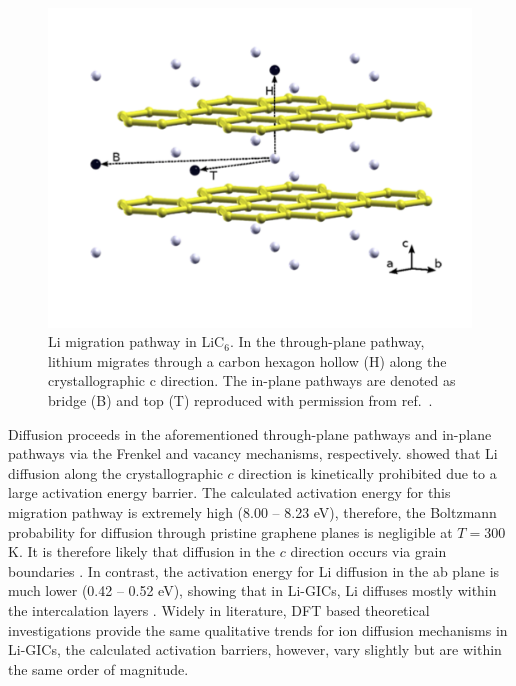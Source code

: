 \documentclass[../main.tex]{subfiles}
\begin{document}
\begin{figure}
    \centering           
    \includegraphics[scale=0.8]{figures/Islam-Fig-LiC6.png}
    \caption{Li migration pathway in LiC$_{6}$. In the through-plane pathway, lithium migrates through a carbon hexagon hollow (H) along the crystallographic c direction. The in-plane pathways are denoted as bridge (B) and top (T) reproduced with permission from ref.~.}
    \label{fig:Rl}
\end{figure}
        

 Diffusion proceeds in the aforementioned through-plane pathways and in-plane pathways via the Frenkel and vacancy mechanisms, respectively. \citeauthor{thinius2014theoretical} showed that Li diffusion along the crystallographic $c$ direction is kinetically prohibited due to a large activation energy barrier. \cite{thinius2014theoretical} The calculated activation energy for this migration pathway is extremely high (8.00 -- 8.23 eV), therefore, the Boltzmann probability for diffusion through pristine graphene planes is negligible at $T=300$ K. It is therefore likely that diffusion in the $c$ direction occurs via grain boundaries \cite{persson2010lithium}. In contrast, the activation energy for Li diffusion in the ab plane is much lower (0.42 -- 0.52 eV), showing that in Li-GICs, Li diffuses mostly within the intercalation layers \cite{thinius2014theoretical}. Widely in literature, DFT based theoretical investigations provide the same qualitative trends for ion diffusion mechanisms in Li-GICs, the calculated activation barriers, however, vary slightly but are within the same order of magnitude. \cite{Imai-JAC-2007,persson2010lithium,toyoura2010effects,Wang} 
\end{document}
